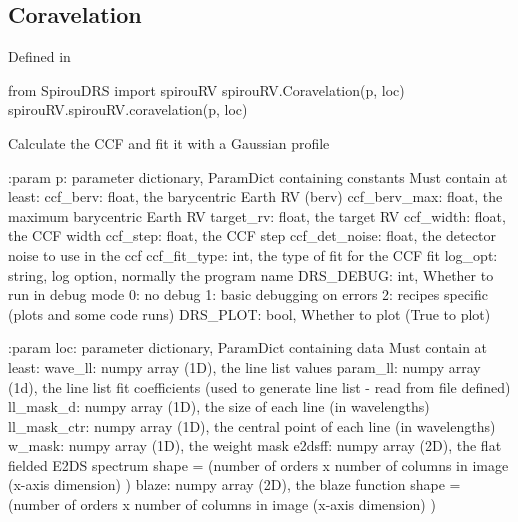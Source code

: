 \begin{minipage}{\textwidth}
\subsection{Coravelation}

Defined in \spirouRV{}

\begin{pythonbox}
from SpirouDRS import spirouRV
spirouRV.Coravelation(p, loc)
spirouRV.spirouRV.coravelation(p, loc)
\end{pythonbox}

\begin{pythondocstring}
Calculate the CCF and fit it with a Gaussian profile

:param p: parameter dictionary, ParamDict containing constants
    Must contain at least:
            ccf_berv: float, the barycentric Earth RV (berv)
            ccf_berv_max: float, the maximum barycentric Earth RV
            target_rv: float, the target RV
            ccf_width: float, the CCF width
            ccf_step: float, the CCF step
            ccf_det_noise: float, the detector noise to use in the ccf
            ccf_fit_type: int, the type of fit for the CCF fit
            log_opt: string, log option, normally the program name
            DRS_DEBUG: int, Whether to run in debug mode
                            0: no debug
                            1: basic debugging on errors
                            2: recipes specific (plots and some code runs)
            DRS_PLOT: bool, Whether to plot (True to plot)

:param loc: parameter dictionary, ParamDict containing data
        Must contain at least:
            wave_ll: numpy array (1D), the line list values
            param_ll: numpy array (1d), the line list fit coefficients
                      (used to generate line list - read from file defined)
            ll_mask_d: numpy array (1D), the size of each line
                       (in wavelengths)
            ll_mask_ctr: numpy array (1D), the central point of each line
                         (in wavelengths)
            w_mask: numpy array (1D), the weight mask
            e2dsff: numpy array (2D), the flat fielded E2DS spectrum
                    shape = (number of orders x number of columns in image
                                                  (x-axis dimension) )
            blaze: numpy array (2D), the blaze function
                    shape = (number of orders x number of columns in image
                                                  (x-axis dimension) )


\end{pythondocstring}
\end{minipage}
